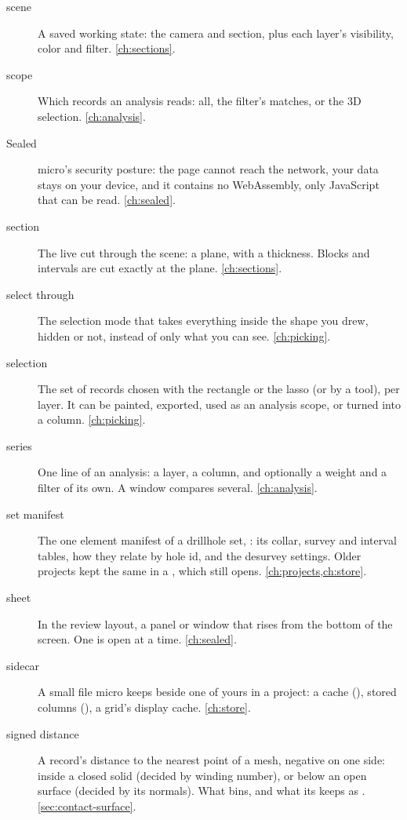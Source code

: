 \begin{description}
\item[scene] A saved working state: the camera and section, plus each layer's visibility, color
  and filter. \cref{ch:sections}.

\item[scope] Which records an analysis reads: all, the filter's matches, or the 3D selection.
  \cref{ch:analysis}.

\item[Sealed] micro's security posture: the page cannot reach the network, your data stays on your
  device, and it contains no WebAssembly, only JavaScript that can be read. \cref{ch:sealed}.

\item[section] The live cut through the scene: a plane, with a thickness. Blocks and intervals are
  cut exactly at the plane. \cref{ch:sections}.

\item[select through] The selection mode that takes everything inside the shape you drew, hidden or
  not, instead of only what you can see. \cref{ch:picking}.

\item[selection] The set of records chosen with the rectangle or the lasso (or by a tool), per
  layer. It can be painted, exported, used as an analysis scope, or turned into a column.
  \cref{ch:picking}.

\item[series] One line of an analysis: a layer, a column, and optionally a weight and a filter of
  its own. A window compares several. \cref{ch:analysis}.

\item[set manifest] The one element manifest of a drillhole set, :
  its collar, survey and interval tables, how they relate by hole id, and the desurvey settings.
  Older projects kept the same in a , which still opens.
  \cref{ch:projects,ch:store}.

\item[sheet] In the review layout, a panel or window that rises from the bottom of the screen. One
  is open at a time. \cref{ch:sealed}.

\item[sidecar] A small file micro keeps beside one of yours in a project: a cache
  (), stored columns (), a grid's display cache. \cref{ch:store}.

\item[signed distance] A record's distance to the nearest point of a mesh, negative on one side:
  inside a closed solid (decided by winding number), or below an open surface (decided by its
  normals). What  bins, and what its  keeps as
  . \cref{sec:contact-surface}.


\end{description}
